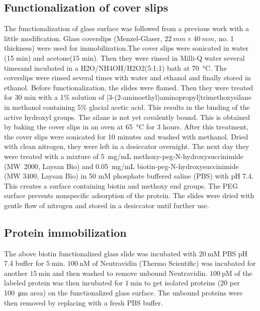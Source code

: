 \documentclass[journal=jacsat,manuscript=article]{achemso}
\begin{document}
\subsection{Functionalization of cover slips}
The functionalization of glass surface was followed from a previous work with a little modification.\cite{gupta2012involvement} Glass coverslips (Menzel-Glaser, $22~mm \times 40~mm$, no. 1 thickness) were used for immobilization.The cover slips were sonicated in water (15 min) and acetone(15 min). Then they were rinsed in Milli-Q water several timesand incubated in a H2O/NH4OH/H2O2(5:1:1) bath at \SI{70}{\celsius}. The coverslips were rinsed several times with water and ethanol and finally stored in ethanol. Before functionalization, the slides were flamed. Then they were treated for 30 min with a 1\% solution of [3-(2-aminoethyl)aminopropyl]trimethoxysilane in methanol containing 5\% glacial acetic acid. This results in the binding of the active hydroxyl groups. The silane is not yet covalently bound. This is obtained by baking the cover slips in an oven at \SI{65}{\celsius} for 3 hours. After this treatment, the cover slips were sonicated for 10 minutes and washed with methanol. Dried with clean nitrogen, they were left in a desiccator overnight. The next day they were treated with a mixture of 5~mg/mL methoxy-peg-N-hydroxysuccinimide (MW~2000, Laysan Bio) and 0.05~mg/mL
biotin-peg-N-hydroxysuccinimide (MW 3400, Laysan Bio) in 50 mM phosphate buffered saline (PBS) with pH 7.4. This creates a surface containing biotin and methoxy end groups. The PEG surface prevents nonspecific adsorption of the protein. The slides were dried with gentle flow of nitrogen and stored in a desiccator until further use.
\subsection{Protein immobilization}
The above biotin functionalized glass slide was incubated with $20~$mM PBS pH 7.4 buffer for $5~$min. $100~$nM of Neutravidin (Thermo Scientific) was incubated for another $15~$min and then washed to remove unbound Neutravidin. $100~$pM of the labeled protein was then incubated for $1~$min to get isolated proteins (20 per \SI{100}{\micro\meter} area) on the functionalized glass surface. The unbound proteins were then removed by replacing with a fresh PBS buffer.
\end{document}
